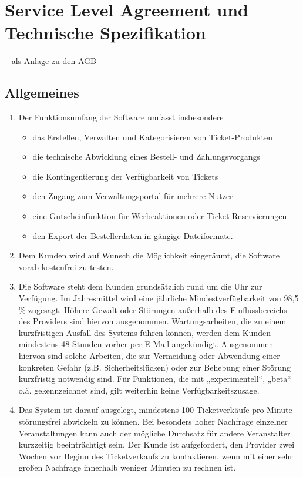 \documentclass{terms}
\begin{document}
\newpage
\section{Service Level Agreement und Technische Spezifikation}
\vspace*{-3mm}
\begin{center}– als Anlage zu den AGB –\end{center}
\vspace*{-3mm}

\subsection{Allgemeines}
\begin{enumerate}
\item Der Funktionsumfang der Software umfasst insbesondere \begin{itemize}
\item das Erstellen, Verwalten und Kategorisieren von Ticket-Produkten 
\item die technische Abwicklung eines Bestell- und Zahlungsvorgangs 
\item die Kontingentierung der Verfügbarkeit von Tickets 
\item den Zugang zum Verwaltungsportal für mehrere Nutzer 
\item eine Gutscheinfunktion für Werbeaktionen oder Ticket-Reservierungen 
\item den Export der Bestellerdaten in gängige Dateiformate.
\end{itemize}
\item Dem Kunden wird auf Wunsch die Möglichkeit eingeräumt, die Software vorab kostenfrei zu testen.
\item Die Software steht dem Kunden grundsätzlich rund um die Uhr zur Verfügung. Im Jahresmittel wird eine jährliche Mindestverfügbarkeit von 98,5 \% zugesagt. Höhere Gewalt oder Störungen außerhalb des Einflussbereichs des Providers sind hiervon ausgenommen. Wartungsarbeiten, die zu einem kurzfristigen Ausfall des Systems führen können, werden dem Kunden mindestens 48 Stunden vorher per E-Mail angekündigt. Ausgenommen hiervon sind solche Arbeiten, die zur Vermeidung oder Abwendung einer konkreten Gefahr (z.B. Sicherheitslücken) oder zur Behebung einer Störung kurzfristig notwendig sind. Für Funktionen, die mit „experimentell“, „beta“ o.ä. gekennzeichnet sind, gilt weiterhin keine Verfügbarkeitszusage.
\item Das System ist darauf ausgelegt, mindestens 100 Ticketverkäufe pro Minute störungsfrei abwickeln zu können. Bei besonders hoher Nachfrage einzelner Veranstaltungen kann auch der mögliche Durchsatz für andere Veranstalter kurzzeitig beeinträchtigt sein. Der Kunde ist aufgefordert, den Provider zwei Wochen vor Beginn des Ticketverkaufs zu kontaktieren, wenn mit einer sehr großen Nachfrage innerhalb weniger Minuten zu rechnen ist.

\end{enumerate}
\end{document}
